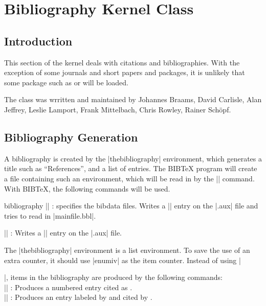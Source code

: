 \chapter{Bibliography Kernel Class}
 \label{kernel:biblio} 
 
\section{Introduction} 
  This section of the kernel deals with citations and bibliographies. With the exception of some journals and
  short papers and packages, it is unlikely that some package such as  or 
  will be loaded.
  
  The class was wrritten and maintained by Johannes Braams,
  David Carlisle,
  Alan Jeffrey,
  Leslie Lamport,
  Frank Mittelbach,
  Chris Rowley,
  Rainer Sch\"opf.

 \section{Bibliography Generation}

  A bibliography is created by the |thebibliography| environment, which
  generates a title such as \enquote{References}, and a list of entries.
  The BIB\TeX{} program will create a file containing such an
  environment, which will be read in by the || command.
  With BIB\TeX, the following commands will be used.

 \begin{docCommand*}{bibliography}{}
  || : specifies
     the bibdata files.  Writes a |\bibdata| entry on the |.aux| file
     and tries to read in |mainfile.bbl|.
\end{docCommand*}

 \DescribeMacro{}
  || :
     Writes a |\bibstyle| entry on the |.aux| file.

  The |thebibliography| environment is a list environment.  To save the
  use of an extra counter, it should use  |enumiv|  as the item
  counter.
  Instead of using |\item|, items in the bibliography are produced by
  the  following commands:\\
    |\bibitem|    : Produces a numbered entry cited as
    .\\
    |\bibitem| : Produces an entry labeled by
     and cited by .

